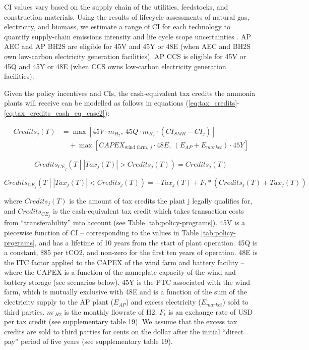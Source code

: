 \documentclass{article}
\begin{document}
 CI values vary based on the supply chain of the utilities, feedstocks, and construction materials. Using the results of lifecycle assessments of natural gas, electricity, and biomass, we estimate a range of CI for each technology to quantify supply-chain emissions intensity and life cycle scope uncertainties \cite{Nicholson2021}. AP AEC and AP BH2S are eligible for 45V and 45Y or 48E (when AEC and BH2S own low-carbon electricity generation facilities). AP CCS is eligible for 45V or 45Q and 45Y or 48E (when CCS owns low-carbon electricity generation facilities). 
	
 Given the policy incentives and CIs, the cash-equivalent tax credits the ammonia plants will receive can be modelled as follows in equations (\ref{eq:tax_credits}-\ref{eq:tax_credits_cash_eq_case2}):

\begin{align}
Credits_j(T) &= \max\left[45V \cdot \dot{m}_{H_2}, \ 45Q \cdot \dot{m}_{H_2} \cdot (CI_{SMR} - CI_j)\right] \nonumber \\
&\quad + \max\left[CAPEX_{\text{wind farm, } j} \cdot 48E, \ (E_{AP} + E_{market}) \cdot 45Y\right]
\label{eq:tax_credits}
\end{align}

\begin{equation}
Credits_{CE_j}\left(T\middle|\left|Tax_j\left(T\right)\right|>Credits_j\left(T\right)\right)=Credits_j\left(T\right)
\label{eq:tax_credits_cash_eq}
\end{equation}

\begin{equation}
Credits_{CE_j}\left(T\middle|\left|Tax_j\left(T\right)\right|<Credits_j\left(T\right)\right)=-Tax_j\left(T\right)
+F_t\ast\left(Credits_j\left(T\right)+Tax_j\left(T\right)\right)
\label{eq:tax_credits_cash_eq_case2}
\end{equation}

where $Credits_j\left(T\right)$ is the amount of tax credits the plant j legally qualifies for, and $Credits_{CE_j}$ is the cash-equivalent tax credit which takes transaction costs from “transferability” into account (see Table \ref{tab:policy-programs}).  45V is a piecewise function of CI – corresponding to the values in Table \ref{tab:policy-programs}, and has a lifetime of 10 years from the start of plant operation. 45Q is a constant, \$85 per  tCO2, and non-zero for the first ten years of operation. 48E is the ITC factor applied to the CAPEX of the wind farm and battery facility  – where the CAPEX is a function of the nameplate capacity of the wind and battery storage (see scenarios below). 45Y is the PTC associated with the wind farm, which is mutually exclusive with 48E and is a function of the sum of the electricity supply to the AP plant ($E_{AP}$) and excess electricity ($E_{market}$) sold to third parties.  ${m^.}_{H2}$ is the monthly flowrate of H2. $F_t$ is an exchange rate of USD per tax credit (see supplementary table 19). We assume that the excess tax credits are sold to third parties for cents on the dollar after the initial “direct pay” period of five years (see supplementary table 19).
\end{document}
